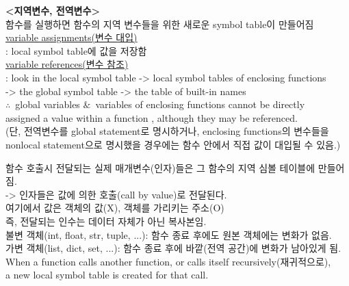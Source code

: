 {\large\textbf{<지역변수, 전역변수>}}\\
함수를 실행하면 함수의 지역 변수들을 위한 새로운 symbol table이 만들어짐 \\

\uline{variable assignments(변수 대입)}\\
: local symbol table에 값을 저장함\\
\uline{ variable references(변수 참조)}\\
: look in the local symbol table -> local symbol tables of enclosing functions \\-> the global symbol table -> the table of built-in names \\
\newline
\(\therefore\)\  \quad global variables \(\&\)\  variables of enclosing functions cannot be directly \\assigned a value within a function , although they may be referenced.\\
(단, 전역변수를 global statement로 명시하거나, enclosing functions의 변수들을 nonlocal statement으로 명시했을 경우에는 함수 안에서 직접 값이 대입될 수 있음.)

함수 호출시 전달되는 실제 매개변수(인자)들은 그 함수의 지역 심볼 테이블에 만들어짐. \\
-> 인자들은 값에 의한 호출(call by value)로 전달된다.\\ 여기에서 값은 객체의 값(X), 객체를 가리키는 주소(O)\\ 즉, 전달되는 인수는 데이터 자체가 아닌 복사본임. \\불변 객체(int, float, str, tuple, ...): 함수 종료 후에도 원본 객체에는 변화가 없음. \\가변 객체(list, dict, set, ...): 함수 종료 후에 바깥(전역 공간)에 변화가 남아있게 됨.\\

When a function calls another function, or calls itself recursively(재귀적으로), \\a new local symbol table is created for that call.


